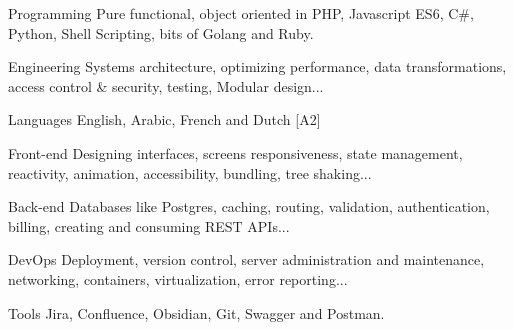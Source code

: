 

\begin{cvskills}

  \cvskill
    {Programming} %
    {Pure functional, object oriented in PHP, Javascript ES6, C\#, Python, Shell Scripting, bits of Golang and Ruby.} %


  \cvskill
    {Engineering} %
    {Systems architecture, optimizing performance, data transformations, access control \& security, testing, Modular design...} %

  \cvskill
    {Languages} %
    {English, Arabic, French and Dutch [A2] } %

  \cvskill
    {Front-end} %
    {Designing interfaces, screens responsiveness, state management, reactivity, animation, accessibility, bundling, tree shaking...} %

  \cvskill
    {Back-end} %
    {Databases like Postgres, caching, routing, validation, authentication, billing, creating and consuming REST APIs...} %

  \cvskill
    {DevOps} %
    {Deployment, version control, server administration and maintenance, networking, containers, virtualization, error reporting...} %

  \cvskill
    {Tools} %
    {Jira, Confluence, Obsidian, Git, Swagger and Postman.} %

\end{cvskills}
